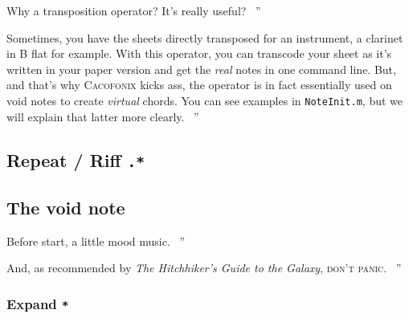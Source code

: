 \documentclass{article}
\newcommand{\cacofonix}{\textsc{Cacofonix}\xspace}
\newcommand{\file}[1]{\texttt{#1}\xspace}
\newcommand{\noteInitFile}{\file{NoteInit.m}}
\newenvironment{meenv}{ \par \noindent \makebox[6em][r]{ \textcolor{mecolor}{Me}: `` --~}}{~''}
\newenvironment{myselfenv}{ \par \noindent \makebox[6em][r]{ \textcolor{myselfcolor}{Myself}: `` --~}}{~''}
\newcommand{ \me }[1]{%
\begin{meenv}%
	#1%
\end{meenv} }
\newcommand{ \myself }[1]{%
\begin{myselfenv}%
	#1%
\end{myselfenv} }
\begin{document}
\me{Why a transposition operator? It's really useful?}
\myself{Sometimes, you have the sheets directly transposed for an instrument, a clarinet in B flat for example. With this operator, you can transcode your sheet as it's written in your paper version and get the \emph{real} notes in one command line. But, and that's why \cacofonix kicks ass, the operator is in fact essentially used on void notes to create \emph{virtual} chords. You can see examples in \noteInitFile, but we will explain that latter more clearly.}

\subsection{Repeat / Riff \lstinline!.*!}
\label{sec:RepeatRiff}

\subsection{The void note}
\label{sec:VoidNote}

\me{Before start, a little mood music.}

\vspace{ 0.25in }

\begin{center}
\end{center}

\vspace{ 0.25in }

\myself{And, as recommended by \emph{The Hitchhiker's Guide to the Galaxy}, \textsc{don't panic}. \rightthumbsup}

\subsubsection{Expand \lstinline!*!}
\label{sec:Expand}
\end{document}

